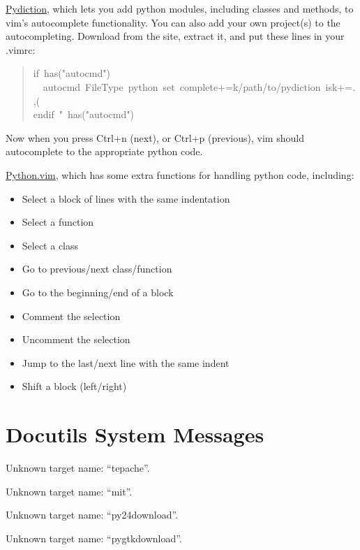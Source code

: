 \documentclass[10pt,a4paper,english]{article}
\begin{document}
\href{http://www.vim.org/scripts/script.php?script_id=850}{Pydiction}, which lets you add python modules, including classes and methods, to vim's 
autocomplete functionality. You can also add your own project(s) to the autocompleting.
Download from the site, extract it, and put these lines in your .vimrc:
\begin{quote}{\ttfamily \raggedright \noindent
if~has("autocmd")~\\
~~autocmd~FileType~python~set~complete+=k/path/to/pydiction~isk+=.,(~\\
endif~"~has("autocmd")~
}\end{quote}

Now when you press Ctrl+n (next), or Ctrl+p (previous), vim should autocomplete to 
the appropriate python code.

\href{http://www.vim.org/scripts/script.php?script_id=30}{Python.vim}, which has some extra functions for handling python code, including:
\begin{itemize}
\item {} 
Select a block of lines with the same indentation

\item {} 
Select a function

\item {} 
Select a class

\item {} 
Go to previous/next class/function

\item {} 
Go to the beginning/end of a block

\item {} 
Comment the selection

\item {} 
Uncomment the selection

\item {} 
Jump to the last/next line with the same indent

\item {} 
Shift a block (left/right)

\end{itemize}



\section*{Docutils System Messages}

Unknown target name: ``tepache''.


Unknown target name: ``mit''.


Unknown target name: ``py24download''.


Unknown target name: ``pygtkdownload''.
\end{document}
